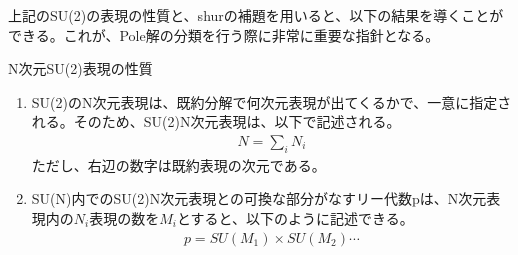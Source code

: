 \documentclass[dvipdfmx,a4paper,10.5pt]{article}
\numberwithin{equation}{section}
\begin{document}
上記のSU(2)の表現の性質と、shurの補題を用いると、以下の結果を導くことができる。これが、Pole解の分類を行う際に非常に重要な指針となる。
\begin{resultbox}{N次元SU(2)表現の性質}
\begin{enumerate}
    \item SU(2)のN次元表現は、既約分解で何次元表現が出てくるかで、一意に指定される。そのため、SU(2)N次元表現は、以下で記述される。
    \begin{align*}
        N=\sum_{i}N_{i}
    \end{align*}
    ただし、右辺の数字は既約表現の次元である。
    \item SU(N)内でのSU(2)N次元表現との可換な部分がなすリー代数pは、N次元表現内の$N_{i}$表現の数を$M_{i}$とすると、以下のように記述できる。
    \begin{align*}
        p=SU(M_{1})\times SU(M_{2})\cdots
    \end{align*}
\end{enumerate}
\end{resultbox}
\end{document}
